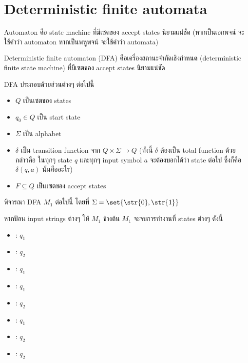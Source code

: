 \section{Deterministic finite automata}

Automaton คือ state machine ที่มีเซตของ accept states นิยามแน่ชัด \enskip (หากเป็นเอกพจน์ จะใช้คำว่า automaton \enskip หากเป็นพหูพจน์ จะใช้คำว่า automata)

Deterministic finite automaton (DFA) คือเครื่องสถานะจำกัดเชิงกำหนด (deterministic finite state machine) ที่มีเซตของ accept states นิยามแน่ชัด

\begin{definition}
DFA ประกอบด้วยส่วนต่างๆ ต่อไปนี้
\begin{itemize}
\item $Q$ เป็นเซตของ states
\item $q_0\in Q$ เป็น start state
\item $\Sigma$ เป็น alphabet
\item $\delta$ เป็น transition function จาก $Q\times\Sigma\to Q$ (ทั้งนี้ $\delta$ ต้องเป็น total function ด้วย กล่าวคือ ในทุกๆ state $q$ และทุกๆ input symbol $a$ จะต้องบอกได้ว่า state ต่อไป ซึ่งก็คือ $\delta(q,a)$ นั้นคืออะไร)
\item $F\subseteq Q$ เป็นเซตของ accept states
\end{itemize}
\end{definition}
%
\begin{example}\label{ex:end1}
พิจารณา DFA $M_1$ ต่อไปนี้ โดยที่ $\Sigma=\set{\str{0},\str{1}}$
\begin{center}
\end{center}
หากป้อน input strings ต่างๆ ให้ $M_1$ ข้างต้น $M_1$ จะจบการทำงานที่ states ต่างๆ ดังนี้
\begin{multicols}{2}
\begin{itemize}
\item {}: $q_1$ \nay
\item {}: $q_2$ \yea
\item {}: $q_1$ \nay
\item {}: $q_1$ \nay
\item {}: $q_2$ \yea
\item {}: $q_1$ \nay
\item {}: $q_2$ \yea
\item {}: $q_2$ \yea
\end{itemize}
\end{multicols}
\end{example}

